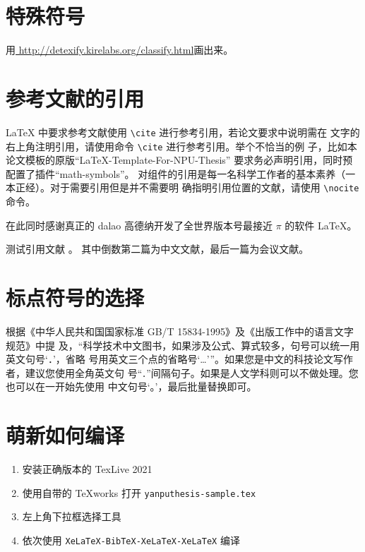 \documentclass[lang=chs, degree=phd, blindreview=false, winfonts=true, academic=true]{yanputhesis}
\begin{document}
\section{特殊符号}

用\href{http://detexify.kirelabs.org/classify.html}{
    http://detexify.kirelabs.org/classify.html}画出来。

\section{参考文献的引用}

\LaTeX{} 中要求参考文献使用 \lstinline`\cite` 进行参考引用，若论文要求中说明需在
文字的右上角注明引用，请使用命令 \lstinline`\cite` 进行参考引用。举个不恰当的例
子，比如本论文模板的原版“LaTeX-Template-For-NPU-Thesis”\cite{NWPUThesisLaTeXTemplate}
要求务必声明引用，同时预配置了插件“math-symbols”\cite{MathSymbolsinLaTeXbypolossk}。
对组件的引用是每一名科学工作者的基本素养（一本正经）。对于需要引用但是并不需要明
确指明引用位置的文献，请使用 \lstinline`\nocite` 命令。

在此同时感谢真正的 dalao 高德纳开发了全世界版本号最接近 $\pi$ 的软件
\LaTeX \cite{knuth1986the}\nocite{lamport1989latex}。

测试引用文献 \cite{szegedy2015going, shen2021peridynamic, chen2014maiyuan, chen2018autonomous}。
其中倒数第二篇为中文文献，最后一篇为会议文献。

\section{标点符号的选择}

根据《中华人民共和国国家标准 GB/T 15834-1995》及《出版工作中的语言文字规范》中提
及，“科学技术中文图书，如果涉及公式、算式较多，句号可以统一用英文句号‘．’，省略
号用英文三个点的省略号‘…’”。如果您是中文的科技论文写作者，建议您使用全角英文句
号“\lstinline`．`”间隔句子。如果是人文学科则可以不做处理。您也可以在一开始先使用
中文句号‘。’，最后批量替换即可。

\section{萌新如何编译}

\begin{enumerate}
    \setlength{\itemsep}{0pt}
    \item 安装正确版本的 TexLive 2021
    \item 使用自带的 TeXworks 打开 \lstinline`yanputhesis-sample.tex`
    \item 左上角下拉框选择工具
    \item 依次使用 \lstinline`XeLaTeX-BibTeX-XeLaTeX-XeLaTeX` 编译
\end{enumerate}
\end{document}
